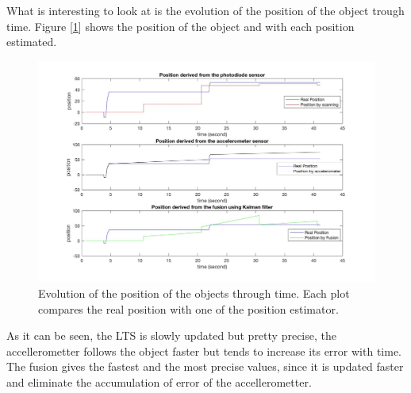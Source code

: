 \documentclass{vldb}
\begin{document}
What is interesting to look at is the evolution of the position of the object trough time. Figure [\ref{im:res}] shows  the position of the object and with each position estimated.
\begin{figure}[h!]
  \includegraphics[scale = 0.15]{Image/ResultKalman.jpg}
  \caption{Evolution of the position of the objects through time. Each plot compares the real position with one of the position estimator.}
  \label{im:res}
\end{figure}

As it can be seen, the LTS is slowly updated but pretty precise, the accellerometter follows the object faster but tends to increase its error with time. The fusion gives the fastest and the most precise values, since it is updated faster and eliminate the accumulation of error of the accellerometter.




\end{document}
